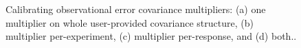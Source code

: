 \begin{figure}[htbp!]
\begin{subfigmatrix}{2}
  \end{subfigmatrix}
  \caption{Calibrating observational error covariance multipliers: (a)
    one multiplier on whole user-provided covariance structure, (b)
    multiplier per-experiment, (c) multiplier per-response, and (d)
    both..}
  \label{fig:uq:obs_err_mult}
\end{figure}

